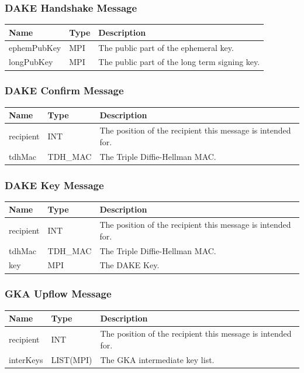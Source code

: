 \documentclass[12pt,titlepage,a4paper]{article}
\begin{document}
\subsubsection{DAKE Handshake Message}
\begin{tabular}{l l l}
Name        & Type      & Description \\
\hline
ephemPubKey & MPI       & The public part of the ephemeral key. \\
longPubKey  & MPI       & The public part of the long term signing key. \\
\end{tabular}

\subsubsection{DAKE Confirm Message}
\begin{tabular}{l l l}
Name        & Type      & Description \\
\hline
recipient   & INT       & The position of the recipient this message is intended for. \\
tdhMac      & TDH\_MAC  & The Triple Diffie-Hellman MAC. \\
\end{tabular}

\subsubsection{DAKE Key Message}
\begin{tabular}{l l l}
Name        & Type      & Description \\
\hline
recipient   & INT       & The position of the recipient this message is intended for. \\
tdhMac      & TDH\_MAC  & The Triple Diffie-Hellman MAC. \\
key         & MPI       & The DAKE Key. \\
\end{tabular}

\subsubsection{GKA Upflow Message}
\begin{tabular}{l l l}
Name        & Type      & Description \\
\hline
recipient   & INT       & The position of the recipient this message is intended for. \\
interKeys   & LIST(MPI) & The GKA intermediate key list. \\
\end{tabular}
\end{document}

